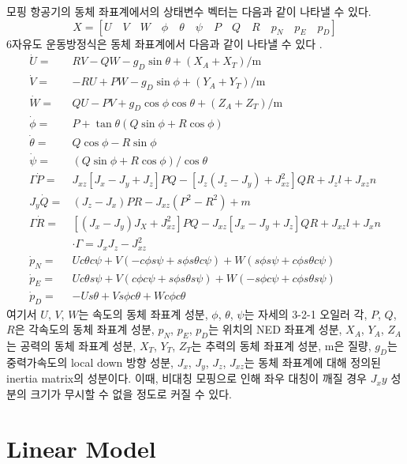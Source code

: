\documentclass[a4paper, 12pt]{report}
\begin{document}
	모핑 항공기의 동체 좌표계에서의 상태변수 벡터는 다음과 같이 나타낼 수 있다.
	\begin{equation}
		X = [U \quad V \quad W \quad \phi \quad \theta \quad \psi \quad P \quad Q \quad R \quad p_N \quad p_E \quad p_D]
	\end{equation}
	6자유도 운동방정식은 동체 좌표계에서 다음과 같이 나타낼 수 있다 \cite{stevens2015aircraft}.
	\begin{align}
		\dot{U} =& RV-QW-g_D\sin\theta+(X_A+X_T)/\text{m} \\
		\dot{V} =& -RU+PW-g_D\sin\phi+(Y_A+Y_T)/\text{m} \\
		\dot{W} =& QU-PV+g_D\cos\phi\cos\theta+(Z_A+Z_T)/\text{m} \\
		\dot{\phi} =& P+\tan\theta(Q\sin\phi+R\cos\phi) \\
		\dot{\theta} =& Q\cos\phi-R\sin\phi \\
		\dot{\psi} =& (Q\sin\phi+R\cos\phi)/\cos\theta \\
		\Gamma\dot{P} =& J_{xz}[J_x-J_y+J_z]PQ-[J_z(J_z-J_y)+J_{xz}^2]QR+J_zl+J_{xz}n \\
		J_y\dot{Q} =& (J_z-J_x)PR-J_{xz}(P^2-R^2)+m \\
		\Gamma\dot{R} =& [(J_x-J_y)J_X+J_{xz}^2]PQ-J_{xz}[J_x-J_y+J_z]QR+J_{xz}l+J_xn \\ 
		& \cdot \Gamma = J_xJ_z-J_{xz}^2 \nonumber \\ 
		\dot{p}_N =& Uc\theta c\psi+V(-c\phi s\psi+s\phi s\theta c\psi)+W(s\phi s\psi+c\phi s\theta c\psi) \\
		\dot{p}_E =& Uc\theta s\psi+V(c\phi c\psi+s\phi s\theta s\psi)+W(-s\phi c\psi+c\phi s\theta s\psi) \\
		\dot{p}_D =& -Us\theta+Vs\phi c\theta+Wc\phi c\theta
	\end{align}
	여기서 $U$, $V$, $W$는 속도의 동체 좌표계 성분, $\phi$, $\theta$, $\psi$는 자세의 3-2-1 오일러 각, $P$, $Q$, $R$은 각속도의 동체 좌표계 성분, $p_N$, $p_E$, $p_D$는 위치의 NED 좌표계 성분, $X_A$, $Y_A$, $Z_A$는 공력의 동체 좌표계 성분, $X_T$, $Y_T$, $Z_T$는 추력의 동체 좌표계 성분, $\text{m}$은 질량, $g_D$는 중력가속도의 local down 방향 성분, $J_x$, $J_y$, $J_z$, $J_{xz}$는 동체 좌표계에 대해 정의된 inertia matrix의 성분이다. 이때, 비대칭 모핑으로 인해 좌우 대칭이 깨질 경우 $J_xy$ 성분의 크기가 무시할 수 없을 정도로 커질 수 있다.
	
	\section{Linear Model}
	
\end{document}
